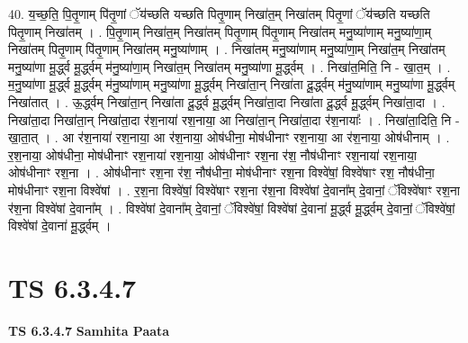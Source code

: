 \documentclass[17pt]{extarticle}
\begin{document}
40. य॒च्छ॒ति॒ पि॒तृ॒णाम् पि॑तृ॒णां ॅय॑च्छति यच्छति पितृ॒णाम् निखा॑त॒म् निखा॑तम् पितृ॒णां ॅय॑च्छति यच्छति पितृ॒णाम् निखा॑तम् । . पि॒तृ॒णाम् निखा॑त॒म् निखा॑तम् पितृ॒णाम् पि॑तृ॒णाम् निखा॑तम् मनु॒ष्या॑णाम् मनु॒ष्या॑णा॒म् निखा॑तम् पितृ॒णाम् पि॑तृ॒णाम् निखा॑तम् मनु॒ष्या॑णाम् । . निखा॑तम् मनु॒ष्या॑णाम् मनु॒ष्या॑णा॒म् निखा॑त॒म् निखा॑तम् मनु॒ष्या॑णा मू॒र्द्ध्व मू॒र्द्ध्वम् म॑नु॒ष्या॑णा॒म् निखा॑त॒म् निखा॑तम् मनु॒ष्या॑णा मू॒र्द्ध्वम् । . निखा॑त॒मिति॒ नि - खा॒त॒म् । . म॒नु॒ष्या॑णा मू॒र्द्ध्व मू॒र्द्ध्वम् म॑नु॒ष्या॑णाम् मनु॒ष्या॑णा मू॒र्द्ध्वम् निखा॑ता॒न् निखा॑ता दू॒र्द्ध्वम् म॑नु॒ष्या॑णाम् मनु॒ष्या॑णा मू॒र्द्ध्वम् निखा॑तात् । . ऊ॒र्द्ध्वम् निखा॑ता॒न् निखा॑ता दू॒र्द्ध्व मू॒र्द्ध्वम् निखा॑ता॒दा निखा॑ता दू॒र्द्ध्व मू॒र्द्ध्वम् निखा॑ता॒दा । . निखा॑ता॒दा निखा॑ता॒न् निखा॑ता॒दा र॑श॒नाया॑ रश॒नाया॒ आ निखा॑ता॒न् निखा॑ता॒दा र॑श॒नायाः᳚ । . निखा॑ता॒दिति॒ नि - खा॒ता॒त् । . आ र॑श॒नाया॑ रश॒नाया॒ आ र॑श॒नाया॒ ओष॑धीना॒ मोष॑धीनाꣳ रश॒नाया॒ आ र॑श॒नाया॒ ओष॑धीनाम् । . र॒श॒नाया॒ ओष॑धीना॒ मोष॑धीनाꣳ रश॒नाया॑ रश॒नाया॒ ओष॑धीनाꣳ रश॒ना र॑श॒ नौष॑धीनाꣳ रश॒नाया॑ रश॒नाया॒ ओष॑धीनाꣳ रश॒ना । . ओष॑धीनाꣳ रश॒ना र॑श॒ नौष॑धीना॒ मोष॑धीनाꣳ रश॒ना विश्वे॑षां॒ विश्वे॑षाꣳ रश॒
नौष॑धीना॒ मोष॑धीनाꣳ रश॒ना विश्वे॑षां । . र॒श॒ना विश्वे॑षां॒ विश्वे॑षाꣳ रश॒ना र॑श॒ना विश्वे॑षां दे॒वाना᳚म् दे॒वानां॒ ॅविश्वे॑षाꣳ रश॒ना र॑श॒ना विश्वे॑षां दे॒वाना᳚म् । . विश्वे॑षां दे॒वाना᳚म् दे॒वानां॒ ॅविश्वे॑षां॒ विश्वे॑षां दे॒वाना॑ मू॒र्द्ध्व मू॒र्द्ध्वम् दे॒वानां॒ ॅविश्वे॑षां॒ विश्वे॑षां दे॒वाना॑ मू॒र्द्ध्वम् । \newline
\pagebreak
{}

\section{ TS 6.3.4.7 }

\textbf{TS 6.3.4.7 } \newline
\textbf{Samhita Paata} \newline
\end{document}
